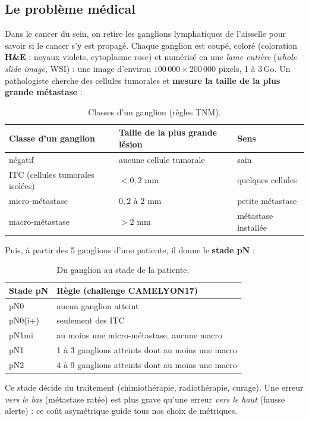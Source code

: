\documentclass[11pt,a4paper]{article}
\begin{document}
\subsection{Le problème médical}
Dans le cancer du sein, on retire les ganglions lymphatiques de l'aisselle pour savoir si le cancer s'y est propagé.
Chaque ganglion est coupé, coloré (coloration \textbf{H\&E} : noyaux violets, cytoplasme rose) et numérisé en une
\emph{lame entière} (\emph{whole slide image}, WSI) : une image d'environ $100\,000 \times 200\,000$ pixels, 1 à 3\,Go.
Un pathologiste cherche des cellules tumorales et \textbf{mesure la taille de la plus grande métastase} :

\begin{table}[H]
\centering
\begin{tabular}{lll}
\toprule
\textbf{Classe d'un ganglion} & \textbf{Taille de la plus grande lésion} & \textbf{Sens} \\
\midrule
négatif & aucune cellule tumorale & sain \\
ITC (cellules tumorales isolées) & $< 0{,}2$ mm & quelques cellules \\
micro-métastase & $0{,}2$ à $2$ mm & petite métastase \\
macro-métastase & $> 2$ mm & métastase installée \\
\bottomrule
\end{tabular}
\caption{Classes d'un ganglion (règles TNM).}
\end{table}

Puis, à partir des 5 ganglions d'une patiente, il donne le \textbf{stade pN} :

\begin{table}[H]
\centering
\begin{tabular}{ll}
\toprule
\textbf{Stade pN} & \textbf{Règle (challenge CAMELYON17)} \\
\midrule
pN0 & aucun ganglion atteint \\
pN0(i+) & seulement des ITC \\
pN1mi & au moins une micro-métastase, aucune macro \\
pN1 & 1 à 3 ganglions atteints dont au moins une macro \\
pN2 & 4 à 9 ganglions atteints dont au moins une macro \\
\bottomrule
\end{tabular}
\caption{Du ganglion au stade de la patiente.}
\end{table}

Ce stade décide du traitement (chimiothérapie, radiothérapie, curage). Une erreur \emph{vers le bas} (métastase ratée)
est plus grave qu'une erreur \emph{vers le haut} (fausse alerte) : ce coût asymétrique guide tous nos choix de métriques.
\end{document}
